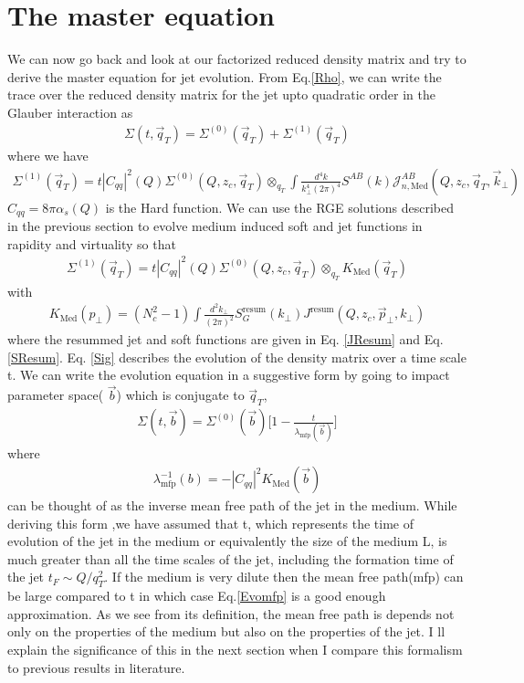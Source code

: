 \documentclass[letter,11pt]{article}
\newcommand{\bea}{\begin{eqnarray}}
\newcommand{\eea}{\end{eqnarray}}
\begin{document}
\section{The master equation}
\label{sec:Master}

We can now go back and look at our factorized reduced density matrix and try to derive the master equation for jet evolution. From Eq.\ref{Rho}, we can write the trace over the reduced density matrix for the jet upto quadratic order in the Glauber interaction as 
\bea
\Sigma(t,\vec{q}_T) = \Sigma^{(0)}(\vec{q}_T)+ \Sigma^{(1)}(\vec{q}_T)
\label{Sig}
\eea
where we have 
\bea
\Sigma^{(1)}(\vec{q}_T) = t|C_{qq}|^2(Q)  \Sigma^{(0)}(Q,z_{c},\vec{q}_T)\otimes_{q_T}\int \frac{d^4k}{k_{\perp}^4(2\pi)^4}S^{AB}(k)\mathcal{J}_{n,\text{Med}}^{AB}(Q, z_{c},\vec{q}_T,\vec{k}_{\perp})
\eea
$C_{qq} = 8\pi \alpha_s(Q)$ is the Hard function.
We can use the RGE solutions described in the previous section to evolve medium induced soft and jet functions in rapidity and virtuality so that 
\bea
 \Sigma^{(1)}(\vec{q}_T) = t|C_{qq}|^2(Q)  \Sigma^{(0)}(Q,z_{c},\vec{q}_T)\otimes_{q_T}K_{\text{Med}}(\vec{q}_T)
\eea
with 
\bea
\label{KMed}
K_{\text{Med}}(p_{\perp}) =(N_c^2-1)\int \frac{d^2k_{\perp}}{(2\pi)^2} S_G^{\text{resum}}(k_{\perp})J^{\text{resum}}(Q, z_{c}, \vec{p}_{\perp}, k_{\perp}) 
\eea
where the resummed jet and soft functions are given in Eq. \ref{JResum} and Eq. \ref{SResum}.
Eq. \ref{Sig}  describes the evolution of the density matrix over a time scale t.  We can write the evolution equation in a suggestive form by going to impact parameter space( $\vec{b}$) which is conjugate to $\vec{q}_T$,
\bea
\Sigma(t,\vec{b}) = \Sigma^{(0)}(\vec{b})\Big[1- \frac{t}{\lambda_{\text{mfp}}(\vec{b})}\Big]
\label{Evomfp}
\eea
where 
\bea
\lambda^{-1}_{\text{mfp}}(b) = -|C_{qq}|^2K_{\text{Med}}(\vec{b})
\label{mfp}
\eea
can be thought of as  the inverse mean free path of the jet in the medium. While deriving this form ,we have assumed that t, which represents the time of evolution of the jet in the medium or equivalently the size of the medium L, is much greater than all the time scales of the jet, including the formation time of the jet $t_F \sim Q/q_T^2$. If the medium is very dilute then the mean free path(mfp) can be large compared to t in which case Eq.\ref{Evomfp} is a good enough approximation.  As we see from its definition, the mean free path is depends not only on the properties of the medium but also on the properties of the jet.  I ll explain the significance of this in the next section when I compare this formalism to previous results in literature.
\end{document}
